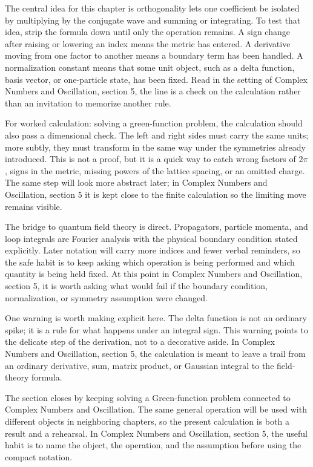 The central idea for this chapter is orthogonality lets one coefficient be isolated by multiplying by the conjugate wave and summing or integrating.  To test that idea, strip the formula down until only the operation remains.  A sign change after raising or lowering an index means the metric has entered.  A derivative moving from one factor to another means a boundary term has been handled.  A normalization constant means that some unit object, such as a delta function, basis vector, or one-particle state, has been fixed.  Read in the setting of Complex Numbers and Oscillation, section 5, the line is a check on the calculation rather than an invitation to memorize another rule.

For worked calculation: solving a green-function problem, the calculation should also pass a dimensional check.  The left and right sides must carry the same units; more subtly, they must transform in the same way under the symmetries already introduced.  This is not a proof, but it is a quick way to catch wrong factors of \(2\pi\), signs in the metric, missing powers of the lattice spacing, or an omitted charge.  The same step will look more abstract later; in Complex Numbers and Oscillation, section 5 it is kept close to the finite calculation so the limiting move remains visible.

The bridge to quantum field theory is direct.  Propagators, particle momenta, and loop integrals are Fourier analysis with the physical boundary condition stated explicitly.  Later notation will carry more indices and fewer verbal reminders, so the safe habit is to keep asking which operation is being performed and which quantity is being held fixed.  At this point in Complex Numbers and Oscillation, section 5, it is worth asking what would fail if the boundary condition, normalization, or symmetry assumption were changed.

One warning is worth making explicit here.  The delta function is not an ordinary spike; it is a rule for what happens under an integral sign.  This warning points to the delicate step of the derivation, not to a decorative aside.  In Complex Numbers and Oscillation, section 5, the calculation is meant to leave a trail from an ordinary derivative, sum, matrix product, or Gaussian integral to the field-theory formula.

The section closes by keeping solving a Green-function problem connected to Complex Numbers and Oscillation.  The same general operation will be used with different objects in neighboring chapters, so the present calculation is both a result and a rehearsal.  In Complex Numbers and Oscillation, section 5, the useful habit is to name the object, the operation, and the assumption before using the compact notation.



